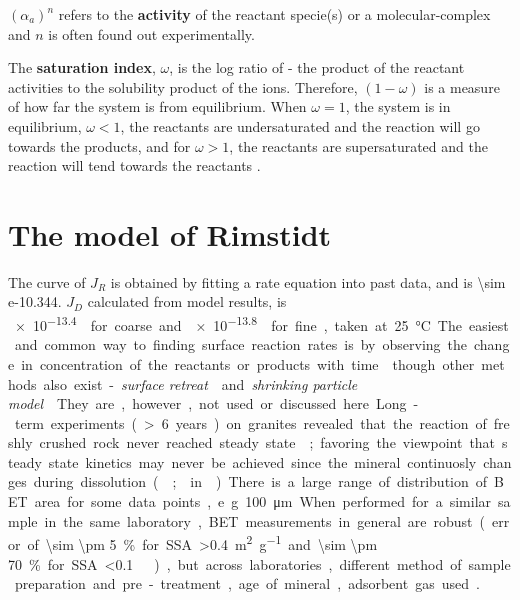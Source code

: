 \noindent \textbf{$(\alpha_{a})^{n}$} refers to the\textbf{ activity} of the reactant specie(s) or a molecular-complex and $n$ is often found out experimentally.

\noindent The \textbf{saturation index}, $\omega$, is the log ratio of - the product of the reactant activities to the solubility product of the ions. Therefore, $(1-\omega)$ is a measure of how far the system is from equilibrium. When $\omega=1$, the system is in equilibrium, $\omega<1$, the reactants are undersaturated and the reaction will go towards the products, and for $\omega>1$, the reactants are supersaturated and the reaction will tend towards the reactants \citep{schott2009}.

\section{The model of Rimstidt}
The curve of $J_R$ is obtained by fitting a rate equation into past data, and is \SI{\sim e-10.344}{\mole\per\metre\square\per\second}. $J_D$ calculated from model results, is \SI{e-13.4}{\mole\per\metre\square\per\second} for coarse and \SI{e-13.8}{\mole\per\metre\square\per\second} for fine, taken at \SI{25}{\degreeCelsius}.

The easiest and common way to finding surface reaction rates is by observing the change in concentration of the reactants or products with time \citep{rimstidt2012,Brantley2008b} though other methods also exist - \textit{surface retreat} \citep{awad2000} and \textit{shrinking particle model} 		   \citep{hanchen2006,prigiobbe2009}. They are, however, not used or discussed here. 

Long-term experiments (> 6 years) on granites revealed that the reaction of freshly crushed rock never reached steady state \citep{white2003}; favoring the viewpoint that steady state kinetics may never be achieved since the mineral continuosly changes during dissolution (\cite{white2003}; \cite{kohler2005} in \cite{Brantley2008b}).

There is a large range of distribution of BET area for some data points, e.g. \SI{100}{\micro\meter}. When performed for a similar sample in the same laboratory, BET measurements in general are robust (error of \SI{\sim \pm 5}{\percent} for SSA \SI{>0.4}{\square\metre\per\gram} and \SI{\sim \pm 70}{\percent} for SSA \SI{<0.1}{\metre\square\per\gram} \citep{brantley2000}), but across laboratories, different method of sample preparation and pre-treatment, age of mineral, adsorbent gas used \citep{brantley2000,rosso2000}.


